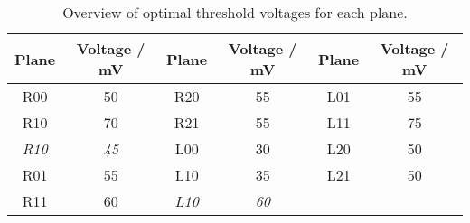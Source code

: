 \begin{table}
    \centering
    \caption{Overview of optimal threshold voltages for each plane.}
    \label{tab:thresh}
    \begin{tabular}{c c | c c | c c}
    \toprule
      {Plane} & {Voltage / mV} & {Plane} & {Voltage / mV} & {Plane} & {Voltage / mV} \\
    \midrule
    R00          & 50 & R20          & 55 & L01  & 55\\
    R10          & 70 & R21          & 55 & L11  & 75\\
    \textit{R10} & \textit{45} & L00          & 30 & L20  & 50\\
    R01          & 55 & L10          & 35 & L21  & 50\\
    R11          & 60 & \textit{L10} & \textit{60} & & \\
    \bottomrule
    \end{tabular}
    \end{table}